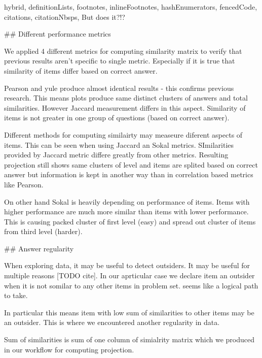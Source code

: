 \documentclass[
  digital, %
  table,   %
  nolof,     %
  nolot,     %
  nocover
]{fithesis3}
\begin{document}
\begin{markdown*}{%
  hybrid,
  definitionLists,
  footnotes,
  inlineFootnotes,
  hashEnumerators,
  fencedCode,
  citations,
  citationNbsps,
}
But does it?!?

## Different performance metrics

We applied 4 different metrics for computing similarity matrix to verify that previous results aren't specific to single metric. Especially if it is true that similarity of items differ based on correct answer.


Pearson and yule produce almost identical results - this confirms previous research. This means plots produce same distinct clusters of answers and total similarities. However Jaccard measurement differs in this aspect. Similarity of items is not greater in one group of questions (based on correct answer).

Different methods for computing similairty may measeure diferent aspects of items. This can be seen when using Jaccard an Sokal metrics. SImilarities provided by Jaccard metric differe greatly from other metrics. Resulting projection still shows same clusters of level and items are splited based on correct answer but information is kept in another way than in correlation based metrics like Pearson.

On other hand Sokal is heavily depending on performance of items. Items with higher performance are much more similar than items with lower performance. This is causing packed cluster of first level (easy) and spread out cluster of items from third level (harder).


## Answer regularity


When exploring data, it may be useful to detect outsiders. It may be useful for multiple reasons [TODO cite]. In our aprticular case we declare item an outsider when it is not somilar to any other items in problem set.
seems like a logical path to take.

In particular this means item with low sum of similarities to other items may be an outsider. This is where we encountered another regularity in data.


 Sum of similarities is sum of one column of simialrity matrix which we produced in our workflow for computing projection.


\end{markdown*}
\end{document}
